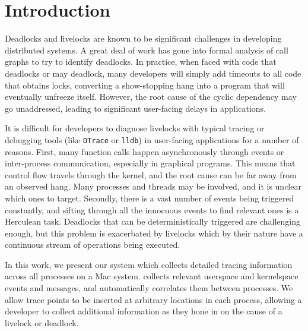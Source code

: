 \section{Introduction} \label{sec:intro}
%

%

Deadlocks and livelocks are known to be significant challenges in developing distributed systems.
A great deal of work has gone into formal analysis of call graphs to try to identify deadlocks.
In practice, when faced with code that deadlocks or may deadlock, many developers will simply add timeouts to all code that obtains locks,
converting a show-stopping hang into a program that will eventually unfreeze itself.
However, the root cause of the cyclic dependency may go unaddressed, leading to significant user-facing delays in applications.

It is difficult for developers to diagnose livelocks with typical tracing or debugging tools (like \texttt{DTrace} or \texttt{lldb})
in user-facing applications for a number of reasons.
First, many function calls happen asynchronously through events or inter-process communication, especially in graphical programs.
This means that control flow travels through the kernel, and the root cause can be far away from an observed hang.
Many processes and threads may be involved, and it is unclear which ones to target.
Secondly, there is a vast number of events being triggered constantly, and
sifting through all the innocuous events to find relevant ones is a Herculean task.
Deadlocks that can be deterministically triggered are challenging enough, but
this problem is exacerbated by livelocks which by their nature have a continuous stream of operations being executed.

In this work, we present our system \textit{\sys} which collects detailed tracing information across all processes on a Mac system.
\sys collects relevant userspace and kernelspace events and messages, and automatically correlates them between processes.
We allow trace points to be inserted at arbitrary locations in each process,
allowing a developer to collect additional information as they hone in on the cause of a livelock or deadlock.

